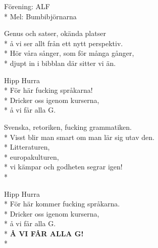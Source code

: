 \begin{SongText}
    \begin{SongInfo}
        Förening: ALF\\*%
        Mel: Bumbibjörnarna
    \end{SongInfo}
    \begin{SongVerse}
        Genus och satser, okända platser\\*%
        å vi ser allt från ett nytt perspektiv.\\*%
        Hör våra sånger, som för många gånger,\\*%
        djupt in i bibblan där sitter vi än.
    \end{SongVerse}
    \begin{SongVerse}
        Hipp Hurra\\*%
        För här fucking språkarna!\\*%
        Dricker oss igenom kurserna,\\*%
        å vi får alla G.
    \end{SongVerse}
    \begin{SongVerse}
        Svenska, retoriken, fucking grammatiken.\\*%
        Visst blir man smart om man lär sig utav den.\\*%
        Litteraturen,\\*%
        europakulturen,\\*%
        vi kämpar och godheten segrar igen!\\*%
    \end{SongVerse}
    \begin{SongVerse}
        Hipp Hurra\\*%
        För här kommer fucking språkarna.\\*%
        Dricker oss igenom kurserna,\\*%
        å vi får alla G.\\*%
        \textbf{Å VI FÅR ALLA G!}\\*%
    \end{SongVerse}
\end{SongText}
